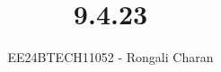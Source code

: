 \documentclass[journal]{IEEEtran}
\begin{document}

\vspace{3cm}

\title{9.4.23}
\author{EE24BTECH11052 - Rongali Charan}
{\let\newpage\relax\maketitle}

\renewcommand{\thefigure}{\theenumi}
\renewcommand{\thetable}{\theenumi}
\setlength{\intextsep}{10pt} %


\renewcommand{\thetable}{\theenumi}
\end{document}
